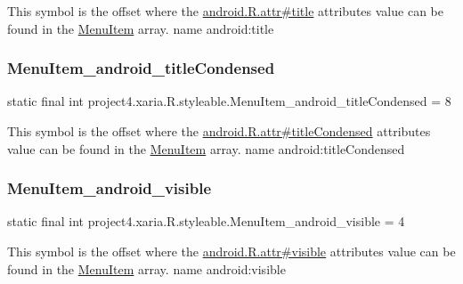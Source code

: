 This symbol is the offset where the \hyperlink{}{android.\+R.\+attr\#title} attribute\textquotesingle{}s value can be found in the \hyperlink{classproject4_1_1xaria_1_1R_1_1styleable_a8a573827fcaba6497e560662224b5530}{Menu\+Item} array.  name android\+:title \mbox{\label{classproject4_1_1xaria_1_1R_1_1styleable_af594043a31da455b0789db1f3a3fbef2}} 
\subsubsection{\texorpdfstring{Menu\+Item\+\_\+android\+\_\+title\+Condensed}{MenuItem\_android\_titleCondensed}}
{\footnotesize\ttfamily static final int project4.\+xaria.\+R.\+styleable.\+Menu\+Item\+\_\+android\+\_\+title\+Condensed = 8\hspace{0.3cm}{\ttfamily [static]}}

This symbol is the offset where the \hyperlink{}{android.\+R.\+attr\#title\+Condensed} attribute\textquotesingle{}s value can be found in the \hyperlink{classproject4_1_1xaria_1_1R_1_1styleable_a8a573827fcaba6497e560662224b5530}{Menu\+Item} array.  name android\+:title\+Condensed \mbox{\label{classproject4_1_1xaria_1_1R_1_1styleable_af028a1cfa670b4bc1eae5a3ccd4db34e}} 
\subsubsection{\texorpdfstring{Menu\+Item\+\_\+android\+\_\+visible}{MenuItem\_android\_visible}}
{\footnotesize\ttfamily static final int project4.\+xaria.\+R.\+styleable.\+Menu\+Item\+\_\+android\+\_\+visible = 4\hspace{0.3cm}{\ttfamily [static]}}

This symbol is the offset where the \hyperlink{}{android.\+R.\+attr\#visible} attribute\textquotesingle{}s value can be found in the \hyperlink{classproject4_1_1xaria_1_1R_1_1styleable_a8a573827fcaba6497e560662224b5530}{Menu\+Item} array.  name android\+:visible \mbox{\label{classproject4_1_1xaria_1_1R_1_1styleable_a8388052a0c350c264867c69c217d9cb3}} 
